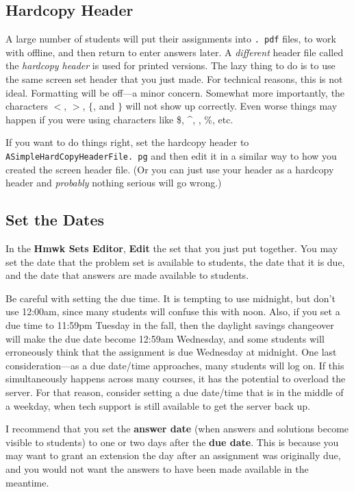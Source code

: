 \documentclass[12pt]{article}
\newcommand{\menu}[1]{\textbf{#1}}
\newcommand{\HSE}{\menu{Hmwk Sets Editor}}
\begin{document}
\subsection{Hardcopy Header}

A large number of students will put their assignments into \texttt{.
	pdf} files, to work with offline, and then return to enter answers later.
A \emph{different} header file called the \emph{hardcopy header} is used for printed versions.
The lazy thing to do is to use the same screen set header that you just made.
For technical reasons, this is not ideal.
Formatting will be off---a minor concern.
Somewhat more importantly, the characters $<$, $>$, $\{$, and $\}$ will not show up correctly.
Even worse things may happen if you were using characters like \$, \^{}, \textunderscore, \%, etc.

If you want to do things right, set the hardcopy header to \texttt{ASimpleHardCopyHeaderFile.
	pg} and then edit it in a similar way to how you created the screen header file. (Or you can just use your header as a hardcopy header and \emph{probably} nothing serious will go wrong.)

\subsection{Set the Dates}
In the \HSE, \menu{Edit} the set that you just put together.
You may set the date that the problem set is available to students, the date that it is due, and the date that answers are made available to students.

Be careful with setting the due time.
It is tempting to use midnight, but don't use 12:00{\sc am}, since many students will confuse this with noon.
Also, if you set a due time to 11:59{\sc pm} Tuesday in the fall, then the daylight savings changeover will make the due date become 12:59{\sc am} Wednesday, and some students will erroneously think that the assignment is due Wednesday at midnight.
One last consideration---as a due date/time approaches, many students will log on.
If this simultaneously happens across many courses, it has the potential to overload the server.
For that reason, consider setting a due date/time that is in the middle of a weekday, when tech support is still available to get the server back up.

I recommend that you set the \menu{answer date} (when answers and solutions become visible to students) to one or two days after the \menu{due date}.
This is because you may want to grant an extension the day after an assignment was originally due, and you would not want the answers to have been made available in the meantime.
\end{document}
